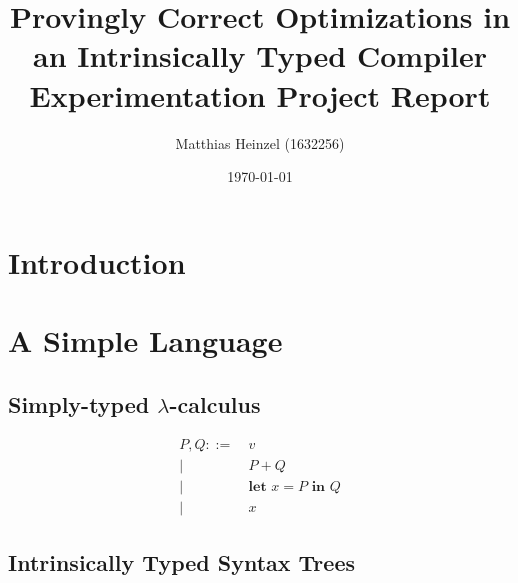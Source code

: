 \documentclass[11pt,a4paper]{article}
\title{Provingly Correct Optimizations in an Intrinsically Typed Compiler\\
  \vspace{1cm}
  \large Experimentation Project Report}
\author{Matthias Heinzel (1632256)}
\date{\today}
\begin{document}
\maketitle
\tableofcontents


\section{Introduction}


\section{A Simple Language}

\subsection{Simply-typed $\lambda$-calculus}

\begin{align*}
  P, Q ::=&\ v
  \\ \big|&\ P + Q
  \\ \big|&\ \textbf{let } x = P \textbf{ in } Q
  \\ \big|&\ x
\end{align*}


\subsection{Intrinsically Typed Syntax Trees}

\CodeLangTypes


\CodeLangCtx


\CodeLangRef

\CodeLangExpr


\CodeLangSemantics
\end{document}
